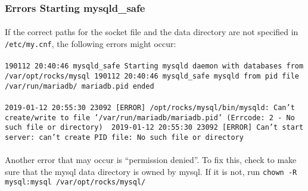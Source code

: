 \documentclass[12pt]{article}
\begin{document}
\subsubsection{Errors Starting mysqld\_safe}
\paragraph{}If the correct paths for the socket file and the data directory are not specified in {\tt/etc/my.cnf}, the following errors might occur:
\paragraph{}{\tt 190112 20:40:46 mysqld\_safe Starting mysqld daemon with databases from /var/opt/rocks/mysql\
  190112 20:40:46 mysqld\_safe mysqld from pid file /var/run/mariadb/\
  mariadb.pid ended}

\paragraph{} {\tt 2019-01-12 20:55:30 23092 [ERROR] /opt/rocks/mysql/bin/mysqld: Can't create/write to file '/var/run/mariadb/mariadb.pid' (Errcode: 2 - No such file or directory) \
  2019-01-12 20:55:30 23092 [ERROR] Can't start server: can't create PID file: No such file or directory}
\paragraph{}Another error that may occur is ``permission denied''. To fix this, check to make sure that the mysql data directory is owned by mysql. If it is not, run {\tt chown -R mysql:mysql /var/opt/rocks/mysql/ }
\end{document}
